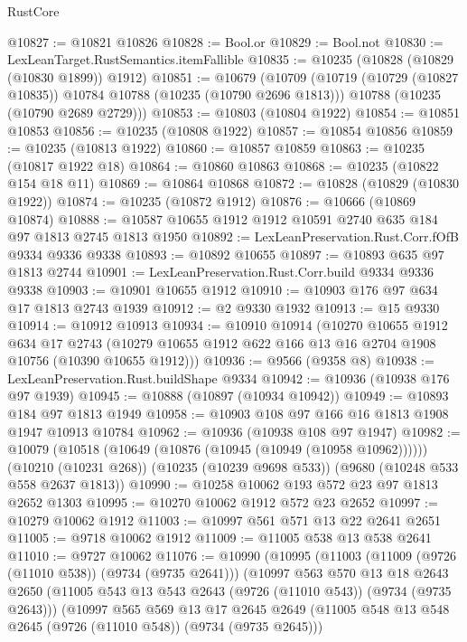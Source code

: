 \begin{lexlean}{RustCore}
\begin{coremodule}
@10827 := @10821 @10826
@10828 := Bool.or
@10829 := Bool.not
@10830 := LexLeanTarget.RustSemantics.itemFallible
@10835 := @10235 (@10828 (@10829 (@10830 @1899)) @1912)
@10851 := @10679
    (@10709
      (@10719 (@10729 (@10827 @10835)) @10784 @10788 (@10235 (@10790 @2696 @1813)))
      @10788
      (@10235 (@10790 @2689 @2729)))
@10853 := @10803 (@10804 @1922)
@10854 := @10851 @10853
@10856 := @10235 (@10808 @1922)
@10857 := @10854 @10856
@10859 := @10235 (@10813 @1922)
@10860 := @10857 @10859
@10863 := @10235 (@10817 @1922 @18)
@10864 := @10860 @10863
@10868 := @10235 (@10822 @154 @18 @11)
@10869 := @10864 @10868
@10872 := @10828 (@10829 (@10830 @1922))
@10874 := @10235 (@10872 @1912)
@10876 := @10666 (@10869 @10874)
@10888 := @10587 @10655 @1912 @1912 @10591 @2740 @635 @184 @97 @1813 @2745 @1813 @1950
@10892 := LexLeanPreservation.Rust.Corr.fOfB @9334 @9336 @9338
@10893 := @10892 @10655
@10897 := @10893 @635 @97 @1813 @2744
@10901 := LexLeanPreservation.Rust.Corr.build @9334 @9336 @9338
@10903 := @10901 @10655 @1912
@10910 := @10903 @176 @97 @634 @17 @1813 @2743 @1939
@10912 := @2 @9330 @1932
@10913 := @15 @9330
@10914 := @10912 @10913
@10934 := @10910
    @10914
    (@10270
      @10655
      @1912
      @634
      @17
      @2743
      (@10279 @10655 @1912 @622 @166 @13 @16 @2704 @1908 @10756 (@10390 @10655 @1912)))
@10936 := @9566 (@9358 @8)
@10938 := LexLeanPreservation.Rust.buildShape @9334
@10942 := @10936 (@10938 @176 @97 @1939)
@10945 := @10888 (@10897 (@10934 @10942))
@10949 := @10893 @184 @97 @1813 @1949
@10958 := @10903 @108 @97 @166 @16 @1813 @1908 @1947 @10913 @10784
@10962 := @10936 (@10938 @108 @97 @1947)
@10982 := @10079
    (@10518 (@10649 (@10876 (@10945 (@10949 (@10958 @10962))))))
    (@10210 (@10231 @268))
    (@10235 (@10239 @9698 @533))
    (@9680 (@10248 @533 @558 @2637 @1813))
@10990 := @10258 @10062 @193 @572 @23 @97 @1813 @2652 @1303
@10995 := @10270 @10062 @1912 @572 @23 @2652
@10997 := @10279 @10062 @1912
@11003 := @10997 @561 @571 @13 @22 @2641 @2651
@11005 := @9718 @10062 @1912
@11009 := @11005 @538 @13 @538 @2641
@11010 := @9727 @10062
@11076 := @10990
    (@10995
      (@11003
        (@11009 (@9726 (@11010 @538)) (@9734 (@9735 @2641)))
        (@10997
          @563
          @570
          @13
          @18
          @2643
          @2650
          (@11005 @543 @13 @543 @2643 (@9726 (@11010 @543)) (@9734 (@9735 @2643)))
          (@10997
            @565
            @569
            @13
            @17
            @2645
            @2649
            (@11005 @548 @13 @548 @2645 (@9726 (@11010 @548)) (@9734 (@9735 @2645)))

\end{coremodule}
\end{lexlean}
